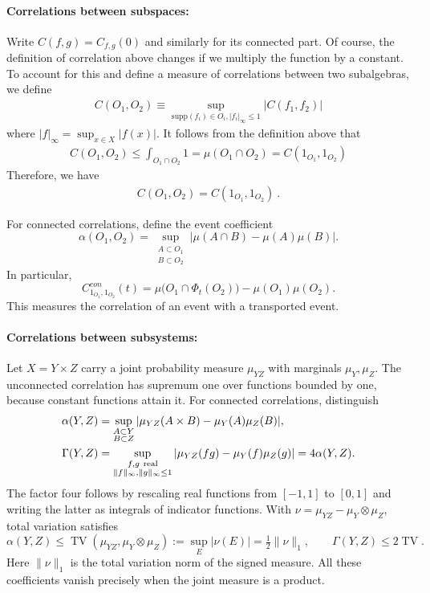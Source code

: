 \documentclass[a4paper,11pt]{article}
\theoremstyle{definition}
\newcommand{\nn}{\nonumber}
\begin{document}
\paragraph{Correlations between subspaces:} Write $C(f,g)=C_{f,g}(0)$ and similarly for its connected part. Of course, the definition of correlation above changes if we multiply the function by a constant. To account for this and define a measure of correlations between two subalgebras, we define
\begin{align}
    C(O_1,O_2)\equiv \sup_{\text{supp}(f_i)\in O_i,|f_i|_\infty\leq 1}|C(f_1,f_2)|
\end{align}
where $|f|_\infty=\sup_{x\in X}|f(x)|$. It follows from the definition above that 
\begin{align}
    C(O_1,O_2)\leq \int_{O_1\cap O_2} 1=\mu(O_1\cap O_2)=C(1_{O_1},1_{O_2})
\end{align}
Therefore, we have
\begin{align}
    C(O_1,O_2)=C(1_{O_1},1_{O_2})\ .
\end{align}

For connected correlations, define the event coefficient
\begin{equation}
 \alpha(O_1,O_2)=
 \sup_{\substack{A\subset O_1\\B\subset O_2}}
 |\mu(A\cap B)-\mu(A)\mu(B)|.
\end{equation}
In particular,
\begin{equation}
 C^{con}_{1_{O_1},1_{O_2}}(t)
 =\mu\bigl(O_1\cap\Phi_t(O_2)\bigr)-\mu(O_1)\mu(O_2).
\end{equation}
This measures the correlation of an event with a transported event.

\paragraph{Correlations between subsystems:}
Let $X=Y\times Z$ carry a joint probability measure $\mu_{YZ}$ with marginals
$\mu_Y,\mu_Z$. The unconnected correlation has supremum one over functions bounded
by one, because constant functions attain it. For connected correlations, distinguish
\begin{align}
 \alpha(Y,Z)&=\sup_{\substack{A\subset Y\\B\subset Z}}
 |\mu_{YZ}(A\times B)-\mu_Y(A)\mu_Z(B)|,\nn\\
 \Gamma(Y,Z)&=\sup_{\substack{f,g\ {\rm real}\\\|f\|_\infty,\|g\|_\infty\leq1}}
 |\mu_{YZ}(fg)-\mu_Y(f)\mu_Z(g)|=4\alpha(Y,Z).
\end{align}
The factor four follows by rescaling real functions from $[-1,1]$ to $[0,1]$
and writing the latter as integrals of indicator functions. With
$\nu=\mu_{YZ}-\mu_Y\otimes\mu_Z$, total variation satisfies
\begin{equation}
 \alpha(Y,Z)\leq\operatorname{TV}(\mu_{YZ},\mu_Y\otimes\mu_Z)
 :=\sup_E|\nu(E)|=\tfrac12\|\nu\|_1,
 \qquad \Gamma(Y,Z)\leq2\operatorname{TV}.
\end{equation}
Here $\|\nu\|_1$ is the total variation norm of the signed measure. All these
coefficients vanish precisely when the joint measure is a product.
\end{document}
